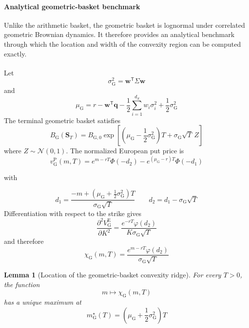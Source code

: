 \documentclass{article}
\numberwithin{equation}{subsection}
\newtheorem{lemma}[theorem]{Lemma}
\theoremstyle{definition}
\theoremstyle{remark}
\begin{document}
\paragraph{Analytical geometric-basket benchmark}
Unlike the arithmetic basket, the geometric basket is lognormal under correlated geometric Brownian dynamics. It therefore provides an analytical benchmark through which the location and width of the convexity region can be computed exactly.\\
\\
Let
\begin{equation}
\sigma_{\mathrm{G}}^2
=
\boldsymbol{w}^{\mathsf T}
\Sigma
\boldsymbol{w}
\end{equation}
and
\begin{equation}
\mu_{\mathrm{G}}
=
r
-
\boldsymbol{w}^{\mathsf T}\boldsymbol{q}
-
\frac{1}{2}
\sum_{i=1}^{d_S}w_i\sigma_i^2
+
\frac{1}{2}\sigma_{\mathrm{G}}^2
\end{equation}
The terminal geometric basket satisfies
\begin{equation}
B_{\mathrm{G}}(\boldsymbol{S}_T)
=
B_{\mathrm{G},0}
\exp
\left[
\left(
\mu_{\mathrm{G}}
-
\frac{1}{2}\sigma_{\mathrm{G}}^2
\right)T
+
\sigma_{\mathrm{G}}\sqrt{T}\,Z
\right]
\end{equation}
where \(Z\sim\mathcal{N}(0,1)\). The normalized European put price is
\begin{equation}
v_{\mathrm{G}}^{\mathrm{P}}(m,T)
=
e^{m-rT}\Phi(-d_2)
-
e^{(\mu_{\mathrm{G}}-r)T}\Phi(-d_1)
\end{equation}

with

\begin{equation}
d_1
=
\frac{
-m+
\left(
\mu_{\mathrm{G}}
+
\frac{1}{2}\sigma_{\mathrm{G}}^2
\right)T
}{
\sigma_{\mathrm{G}}\sqrt{T}
}
\qquad
d_2
=
d_1-\sigma_{\mathrm{G}}\sqrt{T}
\end{equation}
Differentiation with respect to the strike gives
\begin{equation}
\frac{\partial^2V_{\mathrm{G}}^{\mathrm{E}}}{\partial K^2}
=
\frac{
e^{-rT}\varphi(d_2)
}{
K\sigma_{\mathrm{G}}\sqrt{T}
}
\end{equation}
and therefore
\begin{equation}
\chi_{\mathrm{G}}(m,T)
=
\frac{
e^{m-rT}\varphi(d_2)
}{
\sigma_{\mathrm{G}}\sqrt{T}
}
\end{equation}

\begin{lemma}[Location of the geometric-basket convexity ridge]
For every \(T>0\), the function
\begin{equation}
m
\longmapsto
\chi_{\mathrm{G}}(m,T)
\end{equation}
has a unique maximum at
\begin{equation}
m_{\mathrm{G}}^\star(T)
=
\left(
\mu_{\mathrm{G}}
+
\frac{1}{2}\sigma_{\mathrm{G}}^2
\right)T
\end{equation}
\end{lemma}
\end{document}
